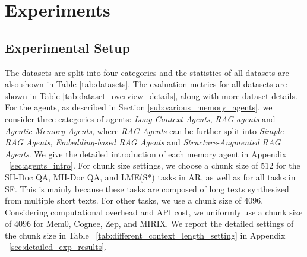 \section{Experiments}

\subsection{Experimental Setup}
The datasets are split into four categories and the statistics of all datasets are also shown in Table \ref{tab:datasets}. The evaluation metrics for all datasets are shown in Table \ref{tab:dataset_overview_details}, along with more dataset details. For the agents, as described in Section \ref{sub:various_memory_agents}, we consider three categories of agents: \emph{Long-Context Agents}, \emph{RAG agents} and \emph{Agentic Memory Agents}, where \emph{RAG Agents} can be further split into \emph{Simple RAG Agents}, \emph{Embedding-based RAG Agents} and \emph{Structure-Augmented RAG Agents}. We give the detailed introduction of each memory agent in Appendix ~\ref{sec:agents_intro}.  For chunk size settings, we choose a chunk size of 512 for the SH-Doc QA, MH-Doc QA, and LME(S*) tasks in AR, as well as for all tasks in SF. This is mainly because these tasks are composed of long texts synthesized from multiple short texts. For other tasks, we use a chunk size of 4096. Considering computational overhead and API cost, we uniformly use a chunk size of 4096 for Mem0, Cognee, Zep, and MIRIX. We report the detailed settings of the chunk size in Table ~\ref{tab:different_context_length_setting} in Appendix ~\ref{sec:detailed_exp_results}. 
\vspace{-6pt}

